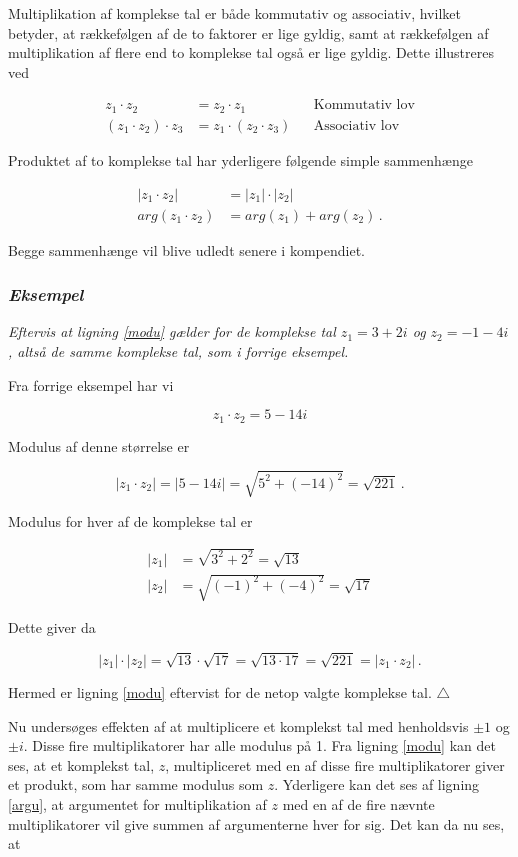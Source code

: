 \documentclass[a4paper, 12pt,titlepage]{article}
\begin{document}
Multiplikation af komplekse tal er både kommutativ og associativ, hvilket betyder, at rækkefølgen af de to faktorer er lige gyldig, samt at rækkefølgen af multiplikation af flere end to komplekse tal også er lige gyldig. Dette illustreres ved

\begin{align}
    z_1 \cdot z_2 &= z_2 \cdot z_1 & &\text{Kommutativ lov}\\
    (z_1 \cdot z_2)\cdot z_3 &= z_1 \cdot (z_2\cdot z_3) & &\text{Associativ lov} 
\end{align}

Produktet af to komplekse tal har yderligere følgende simple sammenhænge

\begin{align}
    |z_1\cdot z_2| &= |z_1| \cdot |z_2|  \label{modu} \\
    arg(z_1 \cdot z_2) &= arg(z_1) + arg(z_2) \,. \label{argu}
\end{align}

Begge sammenhænge vil blive udledt senere i kompendiet.

\subsubsection*{\emph{Eksempel}}
\label{sec:org53e06fe}
\emph{Eftervis at ligning \eqref{modu} gælder for de komplekse tal \(z_1=3+2i\) og \(z_2 = -1 -4i\), altså de samme komplekse tal, som i forrige eksempel.}

Fra forrige eksempel har vi

$$z_1 \cdot z_2 = 5-14i$$

Modulus af denne størrelse er

$$|z_1 \cdot z_2 |= |5-14i| = \sqrt{5^2 +(-14)^2} = \sqrt{221}\,.$$

Modulus for hver af de komplekse tal er

\begin{align*}
    |z_1| &= \sqrt{3^2+2^2} = \sqrt{13} \\
    |z_2| &= \sqrt{(-1)^2+(-4)^2} = \sqrt{17}
\end{align*}

Dette giver da

$$|z_1| \cdot |z_2| = \sqrt{13} \cdot \sqrt{17} = \sqrt{13 \cdot 17} = \sqrt{221} = |z_1 \cdot z_2|\,.$$

Hermed er ligning \eqref{modu} eftervist for de netop valgte komplekse tal. \(\triangle\)

Nu undersøges effekten af at multiplicere et komplekst tal med henholdsvis \(\pm 1\) og \(\pm i\). Disse fire multiplikatorer har alle modulus på 1. Fra ligning \eqref{modu} kan det ses, at et komplekst tal, \(z\), multipliceret med en af disse fire multiplikatorer giver et produkt, som har samme modulus som \(z\). Yderligere kan det ses af ligning \eqref{argu}, at argumentet for multiplikation af \(z\) med en af de fire nævnte multiplikatorer vil give summen af argumenterne hver for sig. Det kan da nu ses, at
\end{document}
